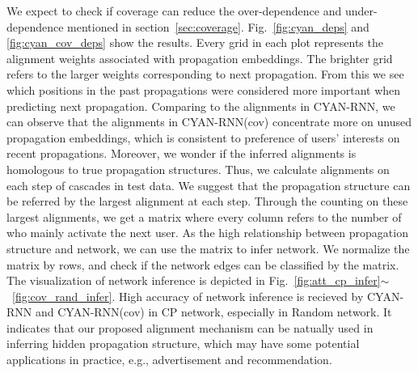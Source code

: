 We expect to check if coverage can reduce the over-dependence and
under-dependence mentioned in section~\ref{sec:coverage}.
Fig.~\ref{fig:cyan_deps} and \ref{fig:cyan_cov_deps} show the results. Every grid
in each plot represents the alignment weights associated with propagation
embeddings.
The brighter grid refers to the larger weights corresponding to next
propagation. From this we see which positions in the past propagations
were considered more important when predicting next propagation. Comparing to
the alignments in CYAN-RNN, we can observe that the alignments in CYAN-RNN(cov)
concentrate more on unused propagation embeddings, which is consistent to
preference of users' interests on recent propagations. Moreover, we wonder if
the inferred alignments is homologous to true propagation structures. Thus, we
calculate alignments on each step of cascades in test data. We suggest that the
propagation structure can be referred by the largest
alignment at each step. Through the counting on these largest
alignments, we get a matrix where every column refers to the number of who
mainly activate the next user. As the high relationship between propagation
structure and network, we can use the matrix to infer network. 
We normalize the matrix by rows, and check if the
network edges can be classified by the matrix. The visualization of network
inference is depicted in
Fig.~\ref{fig:att_cp_infer}$\sim$~\ref{fig:cov_rand_infer}. High
accuracy of network inference is recieved by CYAN-RNN and CYAN-RNN(cov) in
CP network, especially in Random network.
It indicates that our
proposed alignment mechanism can be natually used in inferring hidden
propagation structure, which may have some potential applications in practice,
e.g., advertisement and recommendation.


